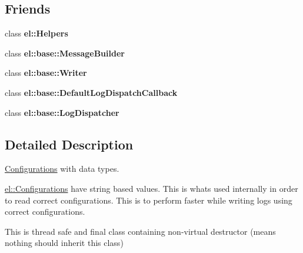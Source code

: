\subsection*{Friends}
\begin{DoxyCompactItemize}
\item 
\hypertarget{classel_1_1base_1_1TypedConfigurations_a2fb8a2c02cbf86247f093c118bed877a}{class {\bfseries el\-::\-Helpers}}\label{classel_1_1base_1_1TypedConfigurations_a2fb8a2c02cbf86247f093c118bed877a}

\item 
\hypertarget{classel_1_1base_1_1TypedConfigurations_a81bbf6fe31fab133d182efa8367304f1}{class {\bfseries el\-::base\-::\-Message\-Builder}}\label{classel_1_1base_1_1TypedConfigurations_a81bbf6fe31fab133d182efa8367304f1}

\item 
\hypertarget{classel_1_1base_1_1TypedConfigurations_a7a728edbb2761d151832daa74d5b2736}{class {\bfseries el\-::base\-::\-Writer}}\label{classel_1_1base_1_1TypedConfigurations_a7a728edbb2761d151832daa74d5b2736}

\item 
\hypertarget{classel_1_1base_1_1TypedConfigurations_a42b1de96d584ae4fecbfc2b9aff95052}{class {\bfseries el\-::base\-::\-Default\-Log\-Dispatch\-Callback}}\label{classel_1_1base_1_1TypedConfigurations_a42b1de96d584ae4fecbfc2b9aff95052}

\item 
\hypertarget{classel_1_1base_1_1TypedConfigurations_a9b37b28ea1c5f8f862cc89f135711d92}{class {\bfseries el\-::base\-::\-Log\-Dispatcher}}\label{classel_1_1base_1_1TypedConfigurations_a9b37b28ea1c5f8f862cc89f135711d92}

\end{DoxyCompactItemize}


\subsection{Detailed Description}
\hyperlink{classel_1_1Configurations}{Configurations} with data types. 

\hyperlink{classel_1_1Configurations}{el\-::\-Configurations} have string based values. This is whats used internally in order to read correct configurations. This is to perform faster while writing logs using correct configurations.

This is thread safe and final class containing non-\/virtual destructor (means nothing should inherit this class) 

